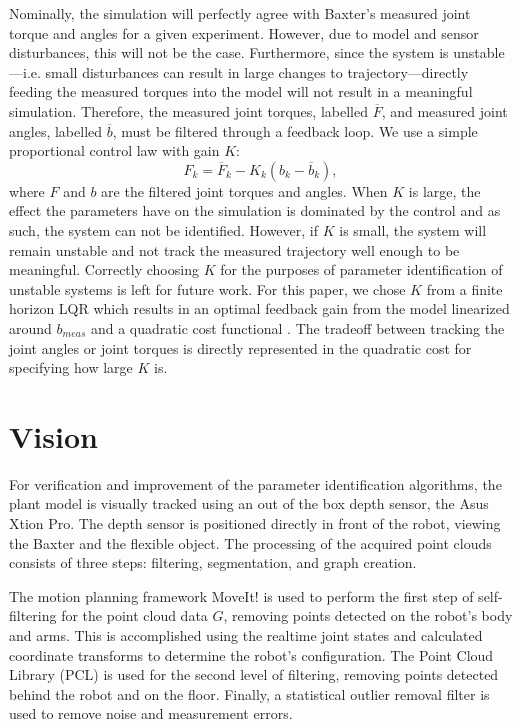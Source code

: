\documentclass[runningheads,a4paper]{llncs}
\begin{document}
Nominally, the simulation will perfectly agree with Baxter's measured joint torque and angles for a given experiment. However, due to model and sensor disturbances, this will not be the case. Furthermore, since the system is unstable---i.e. small disturbances can result in large changes to trajectory---directly feeding the measured torques into the model will not result in a meaningful simulation. Therefore, the measured joint torques, labelled $\overline{F}$, and measured joint angles, labelled $\overline{b}$, must be filtered through a feedback loop. We use a simple proportional control law with gain $K$: 
\[
F_k = \overline{F}_k - K_k (b_k - \overline{b}_k),
\]
where $F$ and $b$ are the filtered joint torques and angles.  When $K$ is large, the effect the parameters have on the simulation is dominated by the control and as such, the system can not be identified. However, if $K$ is small, the system will remain unstable and not track the measured trajectory well enough to be meaningful.  Correctly choosing $K$ for the purposes of parameter identification of unstable systems is left for future work.  For this paper, we chose $K$ from a finite horizon LQR which results in an optimal feedback gain from the model linearized around $b_{meas}$ and a quadratic cost functional \cite{anderson_moore}.  The tradeoff between tracking the joint angles or joint torques is directly represented in the quadratic cost for specifying how large $K$ is.


\section{Vision}
\label{sec-vis}
For verification and improvement of the parameter identification algorithms, the plant model is visually tracked using an out of the box depth sensor, the Asus Xtion Pro. The depth sensor is positioned directly in front of the robot, viewing the Baxter and the flexible object. The processing of the acquired point clouds consists of three steps: filtering, segmentation, and graph creation. 

The motion planning framework MoveIt! \cite{coleman_etal_barrier} is used to perform the first step of self-filtering for the point cloud data $G$, removing points detected on the robot’s body and arms. This is accomplished using the realtime joint states and calculated coordinate transforms to determine the robot’s configuration. The Point Cloud Library (PCL) \cite{rusu20113d} is used for the second level of filtering, removing points detected behind the robot and on the floor. Finally, a statistical outlier removal filter is used to remove noise and measurement errors.
\end{document}
